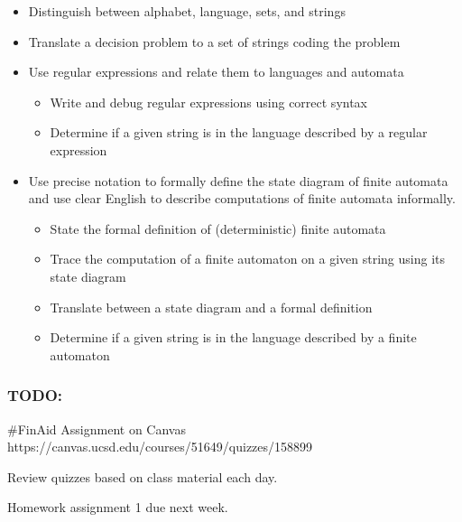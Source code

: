 \begin{itemize}
\item Distinguish between alphabet, language, sets, and strings

\item Translate a decision problem to a set of strings coding the problem

\item Use regular expressions and relate them to languages and automata
\begin{itemize}

   \item Write and debug regular expressions using correct syntax

   \item Determine if a given string is in the language described by a regular expression

\end{itemize}

\item Use precise notation to formally define the state diagram of finite automata and 
use clear English to describe computations of finite automata informally.

\begin{itemize}
   \item State the formal definition of (deterministic) finite automata

   \item Trace the computation of a finite automaton on a given string using its state diagram

   \item Translate between a state diagram and a formal definition

   \item Determine if a given string is in the language described by a finite automaton
\end{itemize}

\end{itemize}

\subsubsection*{TODO:}
\begin{list}
   {\itemsep2pt}
   \item \#FinAid Assignment on Canvas https://canvas.ucsd.edu/courses/51649/quizzes/158899
   \item Review quizzes based on class material each day. 
   \item Homework assignment 1 due next week.
\end{list}

